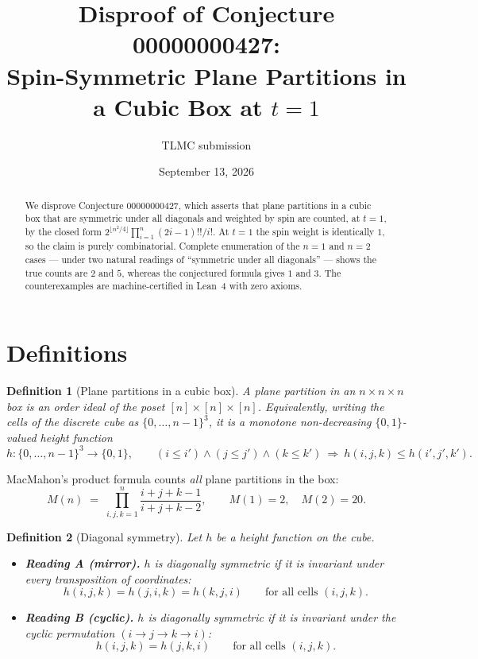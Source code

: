 \documentclass[11pt]{article}
\title{Disproof of Conjecture 00000000427:\\
Spin-Symmetric Plane Partitions in a Cubic Box at $t=1$}
\author{TLMC submission}
\date{September 13, 2026}
\newtheorem{definition}{Definition}
\begin{document}
\maketitle

\begin{abstract}
We disprove Conjecture 00000000427, which asserts that plane partitions in a
cubic box that are symmetric under all diagonals and weighted by spin are
counted, at $t=1$, by the closed form
$2^{\lfloor n^2/4\rfloor}\prod_{i=1}^{n}(2i-1)!!/i!$.
At $t=1$ the spin weight is identically $1$, so the claim is purely
combinatorial.  Complete enumeration of the $n=1$ and $n=2$ cases --- under
two natural readings of ``symmetric under all diagonals'' --- shows the true
counts are $2$ and $5$, whereas the conjectured formula gives $1$ and $3$.
The counterexamples are machine-certified in Lean~4 with zero axioms.
\end{abstract}

\section{Definitions}

\begin{definition}[Plane partitions in a cubic box]
A \emph{plane partition in an $n\times n\times n$ box} is an order ideal of
the poset $[n]\times[n]\times[n]$.  Equivalently, writing the cells of the
discrete cube as $\{0,\dots,n-1\}^3$, it is a monotone non-decreasing
$\{0,1\}$-valued height function
\[
h:\{0,\dots,n-1\}^3\to\{0,1\},\qquad
(i\le i')\wedge(j\le j')\wedge(k\le k')\ \Longrightarrow\ h(i,j,k)\le h(i',j',k').
\]
\end{definition}

MacMahon's product formula counts \emph{all} plane partitions in the box:
\[
M(n)\;=\;\prod_{i,j,k=1}^{n}\frac{i+j+k-1}{i+j+k-2},
\qquad M(1)=2,\quad M(2)=20 .
\]

\begin{definition}[Diagonal symmetry]\label{def:sym}
Let $h$ be a height function on the cube.
\begin{itemize}
\item \textbf{Reading A (mirror).} $h$ is \emph{diagonally symmetric} if it is
invariant under every transposition of coordinates:
\[
h(i,j,k)=h(j,i,k)=h(k,j,i)\qquad\text{for all cells }(i,j,k).
\]
\item \textbf{Reading B (cyclic).} $h$ is \emph{diagonally symmetric} if it is
invariant under the cyclic permutation $(i\to j\to k\to i)$:
\[
h(i,j,k)=h(j,k,i)\qquad\text{for all cells }(i,j,k).
\]
\end{itemize}
\end{definition}
\end{document}
